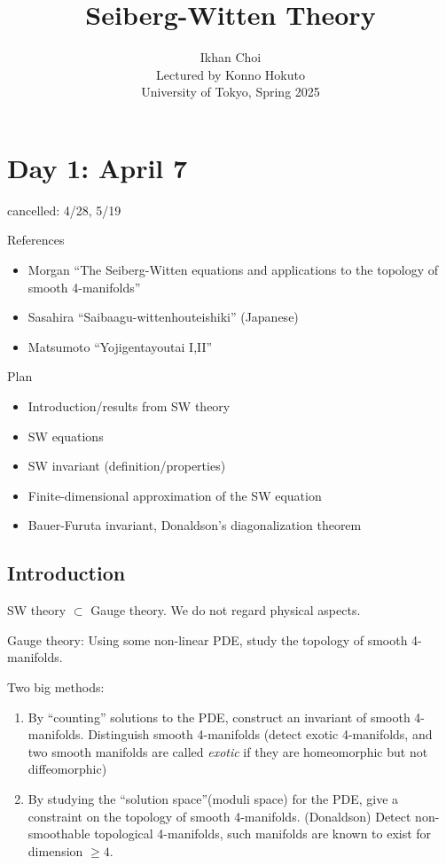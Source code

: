 \documentclass{../../../small}
\begin{document}
\title{Seiberg-Witten Theory}
\author{Ikhan Choi\\Lectured by Konno Hokuto\\University of Tokyo, Spring 2025}
\maketitle
\tableofcontents

\newpage
\section{Day 1: April 7}

cancelled: 4/28, 5/19

References
\begin{itemize}
\item Morgan ``The Seiberg-Witten equations and applications to the topology of smooth 4-manifolds''
\item Sasahira ``Saibaagu-wittenhouteishiki'' (Japanese)
\item Matsumoto ``Yojigentayoutai I,II''
\end{itemize}

Plan
\begin{itemize}
\item Introduction/results from SW theory
\item SW equations
\item SW invariant (definition/properties)
\item Finite-dimensional approximation of the SW equation
\item Bauer-Furuta invariant, Donaldson's diagonalization theorem
\end{itemize}


\subsection*{Introduction}

SW theory $\subset$ Gauge theory.
We do not regard physical aspects.

Gauge theory: Using some non-linear PDE, study the topology of smooth 4-manifolds.

Two big methods:
\begin{enumerate}
\item 
By ``counting'' solutions to the PDE, construct an invariant of smooth 4-manifolds.
Distinguish smooth 4-manifolds (detect exotic 4-manifolds, and two smooth manifolds are called \emph{exotic} if they are homeomorphic but not diffeomorphic)
\item
By studying the ``solution space''(moduli space) for the PDE, give a constraint on the topology of smooth 4-manifolds. (Donaldson)
Detect non-smoothable topological 4-manifolds, such manifolds are known to exist for dimension $\ge4$.
\end{enumerate}
\end{document}
